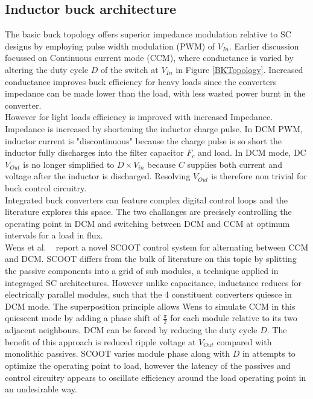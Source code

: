 \documentclass[letterpaper,twocolumn,10pt]{article}
\begin{document}
\subsection{Inductor buck architecture}
The basic buck topology offers superior impedance modulation relative to SC designs by employing pulse width modulation (PWM) of $V_{In}$. Earlier discussion focussed on Continuous current mode (CCM), where conductance is varied by altering the duty cycle $D$ of the switch at $V_{In}$ in Figure \ref{BKTopology}. Increased conductance improves buck efficiency for heavy loads since the converters impedance can be made lower than the load, with less wasted power burnt in the converter.\\
However for light loads efficiency is improved with increased Impedance. Impedance is increased by shortening the inductor charge pulse. In DCM PWM, inductor current is "discontinuous" because the charge pulse is so short the inductor fully discharges into the filter capacitor $F_c$ and load. In DCM mode, DC $V_{Out}$ is no longer simplified to $D \times V_{in}$ because $C$ supplies both current and voltage after the inductor is discharged. Resolving $V_{Out}$ is therefore non trivial for buck control circuitry.\\
\indent Integrated buck converters can feature complex digital control loops and the literature explores this space. The two challanges are precisely controlling the operating point in DCM and switching between DCM and CCM at optimum intervals for a load in flux.\\
Wens et al. ~\cite{Wens2011} report a novel SCOOT control system for alternating between CCM and DCM. SCOOT differs from the bulk of literature on this topic by splitting the passive components into a grid of sub modules, a technique applied in integraged SC architectures. However unlike capacitance, inductance reduces for electrically parallel modules, such that the 4 constituent converters quiesce in DCM mode. The superposition principle allows Wens to simulate CCM in this quiescent mode by adding a phase shift of $\frac{\pi}{2}$ for each module relative to its two adjacent neighbours. DCM can be forced by reducing the duty cycle $D$. The benefit of this approach is reduced ripple voltage at $V_{Out}$ compared with monolithic passives. SCOOT varies module phase along with $D$ in attempts to optimize the operating point to load, however the latency of the passives and control circuitry appears to oscillate efficiency around the load operating point in an undesirable way.\\
\end{document}
